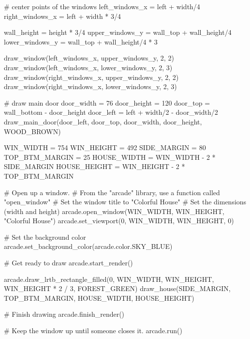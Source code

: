 \begin{py}
    # center points of the windows
    left_windows_x = left + width/4
    right_windows_x = left + width * 3/4

    wall_height = height * 3/4
    upper_windows_y = wall_top + wall_height/4
    lower_windows_y = wall_top + wall_height/4 * 3

    draw_window(left_windows_x, upper_windows_y, 2, 2)
    draw_window(left_windows_x, lower_windows_y, 2, 3)
    draw_window(right_windows_x, upper_windows_y, 2, 2)
    draw_window(right_windows_x, lower_windows_y, 2, 3)

    # draw main door
    door_width = 76
    door_height = 120
    door_top = wall_bottom - door_height
    door_left = left + width/2 - door_width/2
    draw_main_door(door_left, door_top,
                   door_width, door_height,
                   WOOD_BROWN)

WIN_WIDTH = 754
WIN_HEIGHT = 492
SIDE_MARGIN = 80
TOP_BTM_MARGIN = 25
HOUSE_WIDTH = WIN_WIDTH - 2 * SIDE_MARGIN
HOUSE_HEIGHT = WIN_HEIGHT - 2 * TOP_BTM_MARGIN

# Open up a window.
# From the "arcade" library, use a function called "open_window"
# Set the window title to "Colorful House"
# Set the dimensions (width and height)
arcade.open_window(WIN_WIDTH, WIN_HEIGHT, "Colorful House")
arcade.set_viewport(0, WIN_WIDTH, WIN_HEIGHT, 0)

# Set the background color
arcade.set_background_color(arcade.color.SKY_BLUE)

# Get ready to draw
arcade.start_render()

arcade.draw_lrtb_rectangle_filled(0, WIN_WIDTH,
                                  WIN_HEIGHT, WIN_HEIGHT * 2 / 3,
                                  FOREST_GREEN)
draw_house(SIDE_MARGIN, TOP_BTM_MARGIN, HOUSE_WIDTH, HOUSE_HEIGHT)


# Finish drawing
arcade.finish_render()

# Keep the window up until someone closes it.
arcade.run()

\end{py}
%

